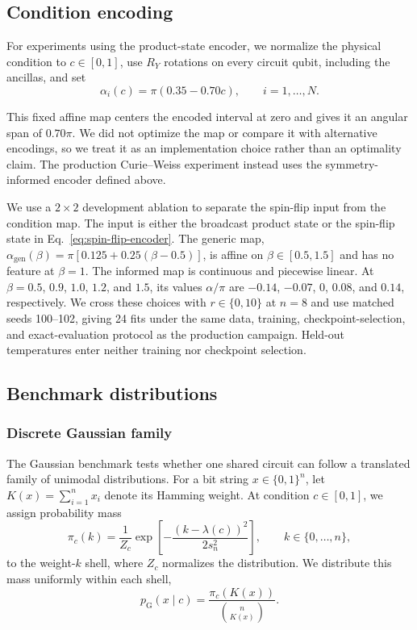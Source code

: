 \documentclass[pra,aps,10pt,twocolumn,floatfix,superscriptaddress,
notitlepage,longbibliography]{revtex4-2}
\begin{document}
\subsection{Condition encoding}

For experiments using the product-state encoder, we normalize the physical condition to $c\in[0,1]$, use $R_Y$ rotations on every circuit qubit, including the ancillas, and set
\begin{equation}
    \alpha_i(c)=\pi(0.35-0.70c),\qquad i=1,\ldots,N.
    \label{eq:experimental-angle-map}
\end{equation}

This fixed affine map centers the encoded interval at zero and gives it an angular span of $0.70\pi$. We did not optimize the map or compare it with alternative encodings, so we treat it as an implementation choice rather than an optimality claim. The production Curie--Weiss experiment instead uses the symmetry-informed encoder defined above.

We use a $2\times2$ development ablation to separate the spin-flip input from the condition map. The input is either the broadcast product state or the spin-flip state in Eq.~\eqref{eq:spin-flip-encoder}. The generic map, $\alpha_{\mathrm{gen}}(\beta)=\pi[0.125+0.25(\beta-0.5)]$, is affine on $\beta\in[0.5,1.5]$ and has no feature at $\beta=1$. The informed map is continuous and piecewise linear. At $\beta=0.5$, $0.9$, $1.0$, $1.2$, and $1.5$, its values $\alpha/\pi$ are $-0.14$, $-0.07$, $0$, $0.08$, and $0.14$, respectively. We cross these choices with $r\in\{0,10\}$ at $n=8$ and use matched seeds 100--102, giving 24 fits under the same data, training, checkpoint-selection, and exact-evaluation protocol as the production campaign. Held-out temperatures enter neither training nor checkpoint selection.

\subsection{Benchmark distributions}

\subsubsection{Discrete Gaussian family}

The Gaussian benchmark tests whether one shared circuit can follow a translated family of unimodal distributions. For a bit string $x\in\{0,1\}^n$, let $K(x)=\sum_{i=1}^n x_i$ denote its Hamming weight. At condition $c\in[0,1]$, we assign probability mass
\begin{equation}
    \pi_c(k)=\frac{1}{Z_c}\exp\!\left[-\frac{(k-\lambda(c))^2}{2s_n^2}\right],
    \qquad k\in\{0,\ldots,n\},
    \label{eq:gaussian-shell-mass}
\end{equation}
to the weight-$k$ shell, where $Z_c$ normalizes the distribution. We distribute this mass uniformly within each shell,
\begin{equation}
    p_{\mathrm G}(x\mid c)=\frac{\pi_c(K(x))}{\binom{n}{K(x)}}.
    \label{eq:gaussian-bitstring-target}
\end{equation}
\end{document}
